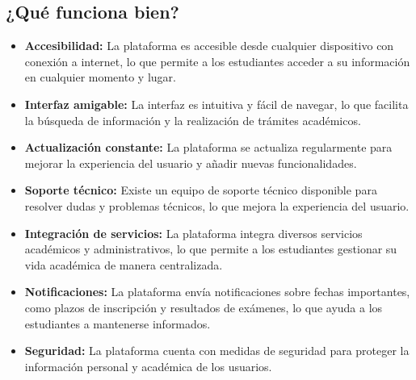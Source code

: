 \documentclass{article}
\begin{document}
\subsection{¿Qué funciona bien?}

\begin{itemize}
  \item \textbf{Accesibilidad:} La plataforma es accesible desde cualquier dispositivo con conexión a internet, lo que permite a los estudiantes acceder a su información en cualquier momento y lugar.
  \item \textbf{Interfaz amigable:} La interfaz es intuitiva y fácil de navegar, lo que facilita la búsqueda de información y la realización de trámites académicos.
  \item \textbf{Actualización constante:} La plataforma se actualiza regularmente para mejorar la experiencia del usuario y añadir nuevas funcionalidades.
  \item \textbf{Soporte técnico:} Existe un equipo de soporte técnico disponible para resolver dudas y problemas técnicos, lo que mejora la experiencia del usuario.
  \item \textbf{Integración de servicios:} La plataforma integra diversos servicios académicos y administrativos, lo que permite a los estudiantes gestionar su vida académica de manera centralizada.
  \item \textbf{Notificaciones:} La plataforma envía notificaciones sobre fechas importantes, como plazos de inscripción y resultados de exámenes, lo que ayuda a los estudiantes a mantenerse informados.
  \item \textbf{Seguridad:} La plataforma cuenta con medidas de seguridad para proteger la información personal y académica de los usuarios.
\end{itemize}
\end{document}
